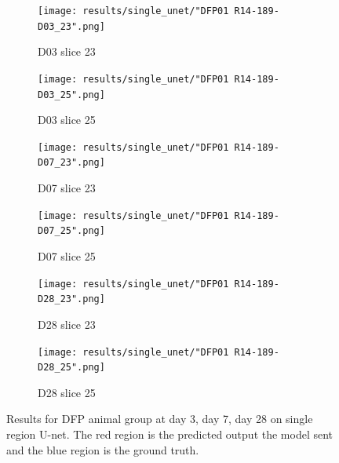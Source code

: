 \begin{figure}[!ht]  
   \centering %
\begin{subfigure}{0.35\textwidth}
  \texttt{[image: results/single\_unet/"DFP01 R14-189-D03\_23".png]}
  \caption{D03 slice 23}
\end{subfigure}\hfil %
\begin{subfigure}{0.35\textwidth}
  \texttt{[image: results/single\_unet/"DFP01 R14-189-D03\_25".png]}
  \caption{D03 slice 25}
\end{subfigure}

\medskip
\begin{subfigure}{0.35\textwidth}
  \texttt{[image: results/single\_unet/"DFP01 R14-189-D07\_23".png]}
  \caption{D07 slice 23}
\end{subfigure}\hfil %
\begin{subfigure}{0.35\textwidth}
  \texttt{[image: results/single\_unet/"DFP01 R14-189-D07\_25".png]}
  \caption{D07 slice 25}
\end{subfigure}

\medskip
\begin{subfigure}{0.35\textwidth}
  \texttt{[image: results/single\_unet/"DFP01 R14-189-D28\_23".png]}
  \caption{D28 slice 23}
\end{subfigure}\hfil %
\begin{subfigure}{0.35\textwidth}
  \texttt{[image: results/single\_unet/"DFP01 R14-189-D28\_25".png]}
  \caption{D28 slice 25}
\end{subfigure}
  
  \caption{Results for DFP animal group at day 3, day 7, day 28 on single region U-net. The red region is the predicted output the model sent and the blue region is the ground truth.}
  \label{fig:results_single_unet_DFP}
\end{figure}


